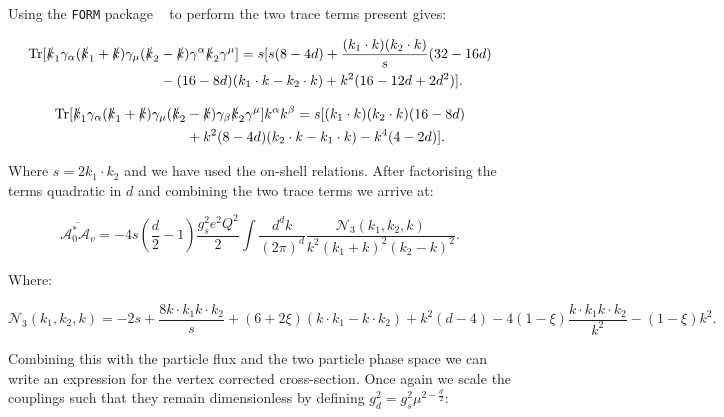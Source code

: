 	Using the \texttt{FORM} package ~\cite{form} to perform the two trace terms present gives:

	\begin{equation}
	\begin{split}
	\operatorname{Tr}[\slashed k_1 \gamma_\alpha(\slashed k_1 + \slashed k)\gamma_\mu(\slashed k_2 &- \slashed k)\gamma^\alpha\slashed k_2\gamma^\mu] = s[s(8-4d) + \frac{(k_1\cdot k)(k_2\cdot k)}{s}(32-16d) \\
	&- (16-8d)(k_1\cdot k - k_2\cdot k) + k^2(16-12d+2d^2)].
	\end{split}
	\end{equation}

	\begin{equation}
	\begin{split}
	\operatorname{Tr}[\slashed k_1 \gamma_\alpha(\slashed k_1 + \slashed k)\gamma_\mu(\slashed k_2 &- \slashed k)\gamma_\beta\slashed k_2\gamma^\mu]k^\alpha k^\beta = s[(k_1\cdot k)(k_2\cdot k)(16 - 8d) \\
	&+ k^2(8 - 4d)(k_2\cdot k - k_1\cdot k) - k^4(4 - 2d)].
	\end{split}
	\end{equation}

	Where $s = 2k_1\cdot k_2$ and we have used the on-shell relations.  After factorising the terms
	quadratic in $d$ and combining the two trace terms we arrive at:

	\begin{equation}
	\overline{\mathcal{A}_0^*\mathcal{A}_v} = -4s\left(\frac{d}{2}-1\right)\frac{g_s^2e^2Q^2}{2}\int\frac{d^{d}k}{(2\pi)^{d}}\frac{\mathcal{N}_3(k_1, k_2, k)}{k^2(k_1+k)^2(k_2-k)^2}.
	\end{equation}

	Where:

	\begin{equation}
	\mathcal{N}_3(k_1, k_2, k) = -2s + \frac{8k\cdot k_1k\cdot k_2}{s} + (6+2\xi)(k\cdot k_1 - k\cdot k_2) + k^2(d-4) - 4(1-\xi)\frac{k\cdot k_1 k\cdot k_2}{k^2} - (1-\xi)k^2.
	\end{equation}

	Combining this with the particle flux and the two particle phase space we can write an expression
	for the vertex corrected cross-section.  Once again we scale the couplings such that they remain
	dimensionless by defining $g_d^2=g_s^2\mu^{2-\frac{d}{2}}$:

